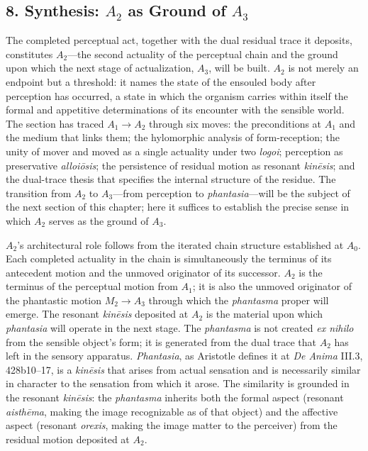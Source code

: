 \documentclass[12pt]{article}
\begin{document}
\subsection*{8. Synthesis: $A_2$ as Ground of $A_3$}

The completed perceptual act, together with the dual residual trace it deposits, constitutes $A_2$---the second actuality of the perceptual chain and the ground upon which the next stage of actualization, $A_3$, will be built. $A_2$ is not merely an endpoint but a threshold: it names the state of the ensouled body after perception has occurred, a state in which the organism carries within itself the formal and appetitive determinations of its encounter with the sensible world. The section has traced $A_1 \to A_2$ through six moves: the preconditions at $A_1$ and the medium that links them; the hylomorphic analysis of form-reception; the unity of mover and moved as a single actuality under two \textit{logoi}; perception as preservative \textit{alloiōsis}; the persistence of residual motion as resonant \textit{kinēsis}; and the dual-trace thesis that specifies the internal structure of the residue. The transition from $A_2$ to $A_3$---from perception to \textit{phantasia}---will be the subject of the next section of this chapter; here it suffices to establish the precise sense in which $A_2$ serves as the ground of $A_3$.

$A_2$'s architectural role follows from the iterated chain structure established at $A_0$. Each completed actuality in the chain is simultaneously the terminus of its antecedent motion and the unmoved originator of its successor. $A_2$ is the terminus of the perceptual motion from $A_1$; it is also the unmoved originator of the phantastic motion $M_2 \to A_3$ through which the \textit{phantasma} proper will emerge. The resonant \textit{kinēsis} deposited at $A_2$ is the material upon which \textit{phantasia} will operate in the next stage. The \textit{phantasma} is not created \textit{ex nihilo} from the sensible object's form; it is generated from the dual trace that $A_2$ has left in the sensory apparatus. \textit{Phantasia}, as Aristotle defines it at \textit{De Anima} III.3, 428b10--17, is a \textit{kinēsis} that arises from actual sensation and is necessarily similar in character to the sensation from which it arose. The similarity is grounded in the resonant \textit{kinēsis}: the \textit{phantasma} inherits both the formal aspect (resonant \textit{aisthēma}, making the image recognizable as of that object) and the affective aspect (resonant \textit{orexis}, making the image matter to the perceiver) from the residual motion deposited at $A_2$.
\end{document}
